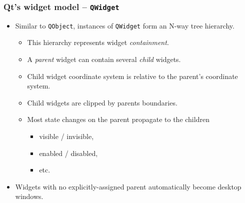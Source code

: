 \begin{frame}
  \frametitle{Qt's widget model -- \texttt{QWidget}}
  \begin{itemize}
    \item Similar to \texttt{QObject}, instances of \texttt{QWidget} form an
    N-way tree hierarchy.
    \begin{itemize}
      \item This hierarchy represents widget {\em containment}.
      \item A {\em parent} widget can contain several {\em child} widgets.
      \item Child widget coordinate system is relative to the parent's
        coordinate system.
      \item Child widgets are clipped by parents boundaries.
      \item Most state changes on the parent propagate to the children
      \begin{itemize}
        \item visible / invisible,
        \item enabled / disabled,
        \item etc.
      \end{itemize}
    \end{itemize}
    \item Widgets with no explicitly-assigned parent automatically become desktop windows.
  \end{itemize}
\end{frame}

